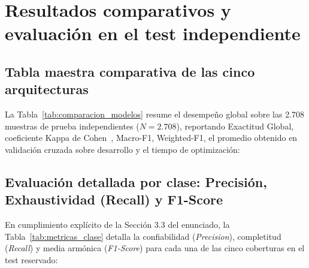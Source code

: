 \documentclass[11pt,a4paper]{article}
\begin{document}
\section{Resultados comparativos y evaluación en el test independiente}

\subsection{Tabla maestra comparativa de las cinco arquitecturas}
La Tabla~\ref{tab:comparacion_modelos} resume el desempeño global sobre las 2.708 muestras de prueba independientes ($N = 2.708$), reportando Exactitud Global, coeficiente Kappa de Cohen~\cite{congalton2019}, Macro-F1, Weighted-F1, el promedio obtenido en validación cruzada sobre desarrollo y el tiempo de optimización:

\begin{table}[H]
\centering
\small
{}
\caption{Comparación estadística general de las cinco arquitecturas evaluadas en el conjunto de prueba independiente.}
\label{tab:comparacion_modelos}
\end{table}

\subsection{Evaluación detallada por clase: Precisión, Exhaustividad (Recall) y F1-Score}
En cumplimiento explícito de la Sección 3.3 del enunciado, la Tabla~\ref{tab:metricas_clase} detalla la confiabilidad (\textit{Precision}), completitud (\textit{Recall}) y media armónica (\textit{F1-Score}) para cada una de las cinco coberturas en el test reservado:
\end{document}
